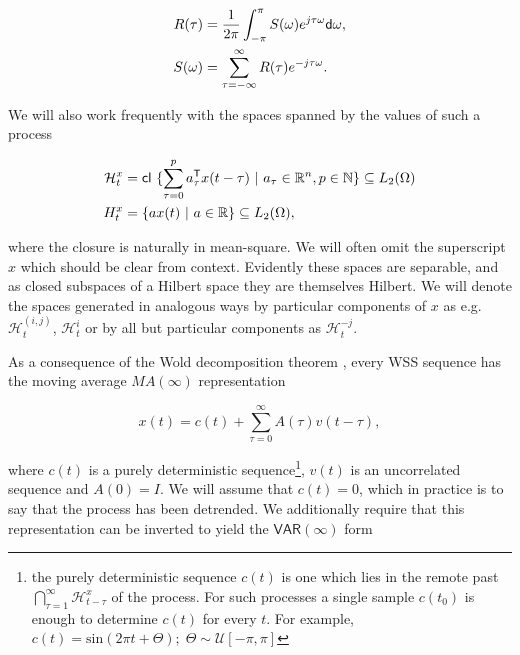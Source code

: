 \documentclass[12pt]{article}
\def\VAR{\mathsf{VAR}}  %
\def\H{\mathcal{H}}  %
\begin{document}
\begin{equation}
  \label{eqn:fourier_pair}
  \begin{aligned}
    R(\tau) &= \frac{1}{2\pi}\int_{-\pi}^\pi S(\omega) e^{j\tau\omega}\mathsf{d} \omega,\\
    S(\omega) &= \sum_{\tau=-\infty}^\infty R(\tau)e^{-j\tau\omega}.
  \end{aligned}
\end{equation}



We will also work frequently with the spaces spanned by the values of
such a process

\begin{equation}
  \label{eq:hilbert_space_defn}
  \begin{aligned}
    \H_t^x &= \cl \{\sum_{\tau = 0}^p a_\tau^\T x(t - \tau)\ |\ a_\tau \in \R^n, p \in \N\} \subseteq L_2(\Omega)\\
    H_t^x &= \{a x(t)\ |\ a \in \R\} \subseteq L_2(\Omega),
  \end{aligned}
\end{equation}

where the closure is naturally in mean-square.  We will often omit the
superscript $x$ which should be clear from context.  Evidently these
spaces are separable, and as closed subspaces of a Hilbert space they
are themselves Hilbert.  We will denote the spaces generated in
analogous ways by particular components of $x$ as e.g.
$\H_t^{(i, j)}$, $\H_t^{i}$ or by all but particular components as
$\H_t^{-j}$.

As a consequence of the Wold decomposition theorem \cite{lindquist},
every WSS sequence has the moving average $MA(\infty)$
representation

\begin{equation}
\label{eqn:wold}
  x(t) = c(t) + \sum_{\tau = 0}^\infty A(\tau) v(t - \tau),
\end{equation}

where $c(t)$ is a purely deterministic sequence\footnote{the purely
  deterministic sequence $c(t)$ is one which lies in the remote past
  $\bigcap_{\tau=1}^\infty \H_{t - \tau}^x$ of the process.  For such
  processes a single sample $c(t_0)$ is enough to determine $c(t)$ for
  every $t$.  For example,
  $c(t) = \text{sin}(2\pi t + \Theta);\; \Theta \sim \mathcal{U}[-\pi,
  \pi]$}, $v(t)$ is an uncorrelated sequence and $A(0) = I$.  We will
assume that $c(t) = 0$, which in practice is to say that the process
has been detrended.  We additionally require that this representation
can be inverted to yield the $\VAR(\infty)$ form
\end{document}
